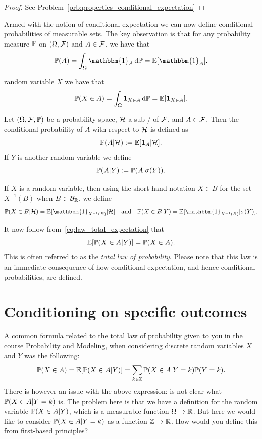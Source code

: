 \begin{proof}
See Problem~\ref{prb:properties_conditional_expectation}
\end{proof}


Armed with the notion of conditional expectation we can now define conditional probabilities of measurable sets. The key observation is that for any probability measure $\mathbb P$ on $(\Omega, \mathcal F)$ and $A \in \mathcal F$, we have that
\[
	\bbP(A) = \int_\Omega \mathbbm{1}_{A} \, \dd \bbP = \bbE[\mathbbm{1}_A].
\]

random variable $X$ we have that
\[
	\mathbb P(X \in A) = \int_\Omega \mathbf{1}_{X \in A} \, \mathrm{d} \mathbb P = \mathbb E[\mathbf{1}_{X \in A}].
\]

\begin{definition}
Let $(\Omega, \mathcal F, \mathbb P)$ be a probability space, $\mathcal H$ a sub-\sigalg/ of $\mathcal F$, and $A \in \mathcal F$. Then the conditional probability of $A$ with respect to $\mathcal H$ is defined as
\[
	\mathbb P(A | \mathcal H) := \mathbb E[\mathbf{1}_{A} | \mathcal H].
\]
If $Y$ is another random variable we define
\[
	\mathbb P(A | Y) := \mathbb P( A | \sigma(Y)).
\]
\end{definition}

If $X$ is a random variable, then using the short-hand notation $X \in B$ for the set $X^{-1}(B)$ when $B \in \mathcal B_{\mathbb R}$, we define
\begin{equation}
	\bbP(X \in B | \cH) = \bbE[\mathbbm{1}_{X^{-1}(B)} | \cH] \quad \text{and} \quad
	\bbP(X \in B | Y) = \bbE[\mathbbm{1}_{X^{-1}(B)} | \sigma(Y)].
\end{equation}

It now follow from~\eqref{eq:law_total_expectation} that
\[
	\mathbb E[\mathbb P(X \in A | Y)] = \mathbb P(X \in A).
\]
This is often referred to as the \emph{total law of probability}. Please note that this law is an immediate consequence of how conditional expectation, and hence conditional probabilities, are defined.



\section{Conditioning on specific outcomes}

A common formula related to the total law of probability given to you in the course Probability and Modeling, when considering discrete random variables $X$ and $Y$ was the following:
\begin{equation}\label{eq:law_of_probability_discrete}
	\mathbb P(X \in A) = \mathbb E[\mathbb P(X \in A | Y)] = \sum_{k \in \mathbb Z} \mathbb P(X \in A | Y= k) \mathbb P(Y = k). 
\end{equation}
There is however an issue with the above expression: is not clear what $\mathbb P(X \in A | Y = k)$ is. The problem here is that we have a definition for the random variable $\mathbb P(X \in A | Y)$, which is a measurable function $\Omega \to \mathbb R$. But here we would like to consider $\mathbb P(X \in A | Y = k)$ as a function $\mathbb Z \to \mathbb R$. How would you define this from first-based principles?

